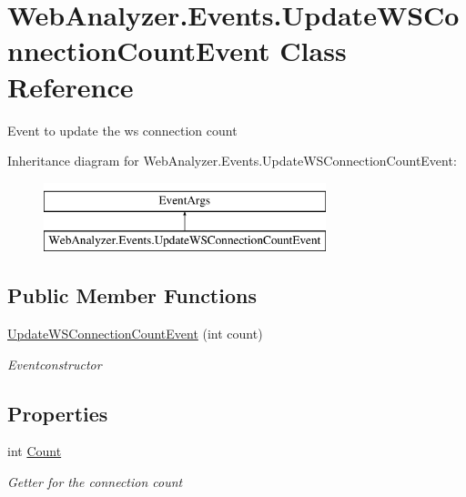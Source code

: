 \hypertarget{class_web_analyzer_1_1_events_1_1_update_w_s_connection_count_event}{}\section{Web\+Analyzer.\+Events.\+Update\+W\+S\+Connection\+Count\+Event Class Reference}
\label{class_web_analyzer_1_1_events_1_1_update_w_s_connection_count_event}


Event to update the ws connection count  


Inheritance diagram for Web\+Analyzer.\+Events.\+Update\+W\+S\+Connection\+Count\+Event\+:\begin{figure}[H]
\begin{center}
\leavevmode
\includegraphics[height=2.000000cm]{class_web_analyzer_1_1_events_1_1_update_w_s_connection_count_event}
\end{center}
\end{figure}
\subsection*{Public Member Functions}
\begin{DoxyCompactItemize}
\item 
\hyperlink{class_web_analyzer_1_1_events_1_1_update_w_s_connection_count_event_afd006af18ad05c117339a6350e772640}{Update\+W\+S\+Connection\+Count\+Event} (int count)
\begin{DoxyCompactList}\small\item\em Eventconstructor \end{DoxyCompactList}\end{DoxyCompactItemize}
\subsection*{Properties}
\begin{DoxyCompactItemize}
\item 
int \hyperlink{class_web_analyzer_1_1_events_1_1_update_w_s_connection_count_event_acb56db24868f14519a9bb0781413a337}{Count}
\begin{DoxyCompactList}\small\item\em Getter for the connection count \end{DoxyCompactList}\end{DoxyCompactItemize}
